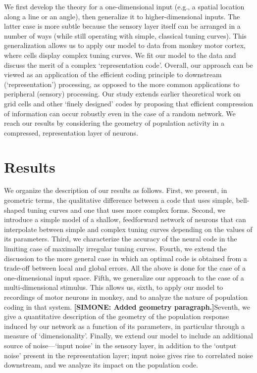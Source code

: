 \documentclass[a4paper]{article}%
\begin{document}
We first develop the theory for a one-dimensional input (e.g., a spatial
location along a line or an angle), then generalize it to higher-dimensional
inputs. The latter case is more subtle because the sensory layer itself can be
arranged in a number of ways (while still operating with simple, classical
tuning curves). This generalization allows us to apply our model to data from
monkey motor cortex, where cells display complex tuning curves. We fit our
model to the data and discuss the merit of a complex `representation code'.
Overall, our approach can be viewed as an application of the efficient coding
principle to downstream (`representation') processing, as opposed to the more
common applications to peripheral (sensory) processing. Our study extends
earlier theoretical work on grid cells and other `finely designed' codes by
proposing that efficient compression of information can occur robustly even in
the case of a random network. We reach our results by considering the geometry
of population activity in a compressed, representation layer of neurons.

\section{Results}

We organize the description of our results as follows. First, we present, in
geometric terms, the qualitative difference between a code that uses simple,
bell-shaped tuning curves and one that uses more complex forms. Second, we
introduce a simple model of a shallow, feedforward network of neurons that can
interpolate between simple and complex tuning curves depending on the values
of its parameters. Third, we characterize the accuracy of the neural code in
the limiting case of maximally irregular tuning curves. Fourth, we extend the
discussion to the more general case in which an optimal code is obtained from
a trade-off between local and global errors. All the above is done for the
case of a one-dimensional input space. Fifth, we generalize our approach to
the case of a multi-dimensional stimulus. This allows us, sixth, to apply our
model to recordings of motor neurons in monkey, and to analyze the nature of
population coding in that system. \textbf{[SIMONE: Added geometry paragraph.]}Seventh, we give a quantitative description of the geometry of the population response induced by our network as a function of its parameters, in particular through a measure of `dimensionality'. Finally, we extend our model to include an
additional source of noise---`input noise' in the sensory layer, in addition
to the `output noise' present in the representation layer; input noise gives
rise to correlated noise downstream, and we analyze its impact on the
population code.
\end{document}
